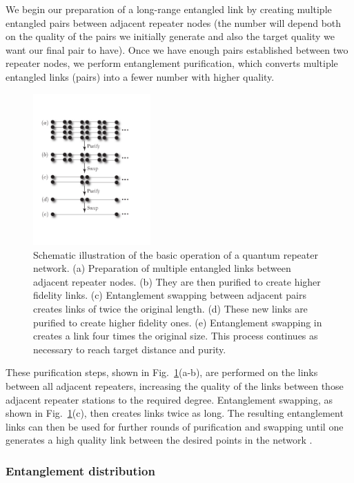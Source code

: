 \documentclass[twocolumn, aps, rmp, amsmath, amssymb, nofootinbib, superscriptaddress, longbibliography, floatfix, table-of-contents, eqsecnum]{revtex4-1}
\begin{document}
We begin our preparation of a long-range entangled link by creating multiple entangled pairs between adjacent repeater nodes (the number will depend both on the quality of the pairs we initially generate and also the target quality we want our final pair to have). Once we have enough pairs established between two repeater nodes, we perform entanglement purification, which converts multiple entangled links (pairs) into a fewer number with higher quality. 
\begin{figure}[!htb]
\includegraphics[width=0.4\textwidth]{repeaters_2}
\caption{Schematic illustration of the basic operation of a quantum repeater network. (a) Preparation of multiple entangled links between adjacent repeater nodes. (b) They are then purified to create higher fidelity links. (c) Entanglement swapping between adjacent pairs creates links of twice the original length. (d) These new links are purified to create higher fidelity ones. (e) Entanglement swapping in creates a link four times the original size. This process continues as necessary to reach target distance and purity.} 
\label{fig:repeaters_2}
\end{figure} 
These purification steps, shown in Fig.~\ref{fig:repeaters_2}(a-b), are performed on the links between all adjacent repeaters, increasing the quality of the links between those adjacent repeater stations to the required degree. Entanglement swapping, as shown in Fig.~\ref{fig:repeaters_2}(c), then creates links twice as long. The resulting entanglement links can then be used for further rounds of purification and swapping until one generates a high quality link between the desired points in the network \cite{}. 

\subsubsection{Entanglement distribution}\label{sec:reps_ent_dist}
\end{document}
